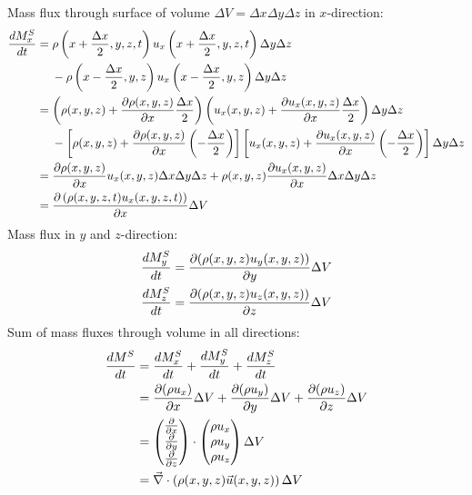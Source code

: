 Mass flux through surface of volume $\Delta V = \Delta x \Delta y \Delta z$ in $x$-direction:
\begin{align}
\begin{split}
\frac{d M_x^S}{d t} &= \rho \left(x+\frac{\Delta x}{2},y,z,t\right)u_x\left(x+\frac{\Delta x}{2},y,z,t\right)\Delta y \Delta z\\
&\hspace{4.5mm} - \rho \left(x-\frac{\Delta x}{2},y,z\right)u_x\left(x-\frac{\Delta x}{2},y,z\right)\Delta y \Delta z
\\
&=\left(\rho(x,y,z)+\frac{\partial \rho(x,y,z)}{\partial x}\frac{\Delta x}{2}\right)\left(u_x(x,y,z)+\frac{\partial u_x(x,y,z)}{\partial x}\frac{\Delta x}{2}\right) \Delta y \Delta z \\
&\hspace{4.5mm} - \left[\rho(x,y,z)+\frac{\partial \rho(x,y,z)}{\partial x}\left(-\frac{\Delta x}{2}\right)\right]\left[u_x(x,y,z)+\frac{\partial u_x(x,y,z)}{\partial x}\left(-\frac{\Delta x}{2}\right)\right] \Delta y \Delta z
\\
&=\frac{\partial \rho(x,y,z)}{\partial x}u_x(x,y,z)\Delta x \Delta y \Delta z  + \rho(x,y,z)\frac{\partial u_x(x,y,z)}{\partial x}\Delta x \Delta y \Delta z\\
&=\frac{\partial \left(\rho(x,y,z,t)u_x(x,y,z,t)\right)}{\partial x}\Delta V
\end{split}
\end{align}
Mass flux in $y$ and $z$-direction:
\begin{align}
\frac{d M_y^S}{d t} &= \frac{\partial (\rho(x,y,z)u_y(x,y,z))}{\partial y}\Delta V\\
\frac{d M_z^S}{d t} &= \frac{\partial (\rho(x,y,z)u_z(x,y,z))}{\partial z}\Delta V
\end{align}
Sum of mass fluxes through volume in all directions:
\begin{align}
\frac{d M^S}{d t} &= \frac{d M_x^S}{d t} + \frac{d M_y^S}{d t} + \frac{d M_z^S}{d t} \\
&= \frac{\partial (\rho u_x)}{\partial x}\Delta V + \frac{\partial (\rho u_y)}{\partial y}\Delta V + \frac{\partial (\rho u_z)}{\partial z}\Delta V\\
&=
\begin{pmatrix}
\frac{\partial }{\partial x} \\ \frac{\partial }{\partial y} \\ \frac{\partial }{\partial z}
\end{pmatrix}
\cdot
\begin{pmatrix}
\rho u_x \\ \rho u_y \\ \rho u_z
\end{pmatrix}
\Delta V \\
&= \vec{\nabla}\cdot\left(\rho(x,y,z)\vec{u}(x,y,z)\right)\Delta V
\end{align}
